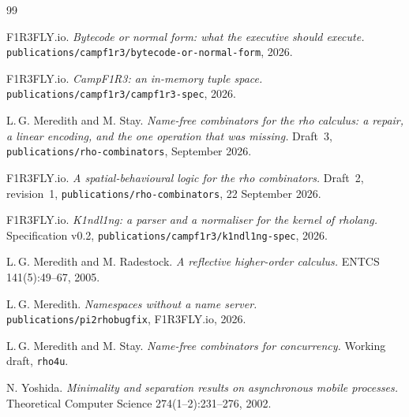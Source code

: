 \documentclass[11pt,a4paper]{article}
\newcommand{\code}[1]{\texttt{#1}}
\theoremstyle{definition}
\theoremstyle{plain}
\begin{document}
\begin{thebibliography}{99}

 F1R3FLY.io.
\emph{Bytecode or normal form: what the executive should execute.}
\code{publications/campf1r3/bytecode-or-normal-form}, 2026.

 F1R3FLY.io.
\emph{CampF1R3: an in-memory tuple space.}
\code{publications/campf1r3/campf1r3-spec}, 2026.

 L.\,G. Meredith and M. Stay.
\emph{Name-free combinators for the rho calculus: a repair, a linear encoding,
and the one operation that was missing.} Draft~3,
\code{publications/rho-combinators}, September 2026.

 F1R3FLY.io.
\emph{A spatial-behavioural logic for the rho combinators.} Draft~2,
revision~1, \code{publications/rho-combinators}, 22 September 2026.

 F1R3FLY.io.
\emph{K1ndl1ng: a parser and a normaliser for the kernel of rholang.}
Specification v0.2, \code{publications/campf1r3/k1ndl1ng-spec}, 2026.

 L.\,G. Meredith and M. Radestock.
\emph{A reflective higher-order calculus.} ENTCS 141(5):49--67, 2005.

 L.\,G. Meredith.
\emph{Namespaces without a name server.} \code{publications/pi2rhobugfix},
F1R3FLY.io, 2026.

 L.\,G. Meredith and M. Stay.
\emph{Name-free combinators for concurrency.} Working draft, \code{rho4u}.

 N. Yoshida.
\emph{Minimality and separation results on asynchronous mobile processes.}
Theoretical Computer Science 274(1--2):231--276, 2002.

\end{thebibliography}
\end{document}
